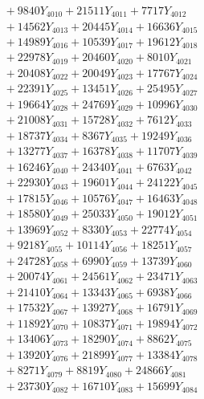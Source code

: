 \documentclass[a4paper,10pt]{article}
\begin{document}
{\begin{align}
&\;  + 9840 Y_{4010} + 21511 Y_{4011} + 7717 Y_{4012} \\[0.3ex]
&\;  + 14562 Y_{4013} + 20445 Y_{4014} + 16636 Y_{4015} \\[0.3ex]
&\;  + 14989 Y_{4016} + 10539 Y_{4017} + 19612 Y_{4018} \\[0.5ex]\allowbreak
&\;  + 22978 Y_{4019} + 20460 Y_{4020} + 8010 Y_{4021} \\[0.3ex]
&\;  + 20408 Y_{4022} + 20049 Y_{4023} + 17767 Y_{4024} \\[0.3ex]
&\;  + 22391 Y_{4025} + 13451 Y_{4026} + 25495 Y_{4027} \\[0.3ex]
&\;  + 19664 Y_{4028} + 24769 Y_{4029} + 10996 Y_{4030} \\[0.3ex]
&\;  + 21008 Y_{4031} + 15728 Y_{4032} + 7612 Y_{4033} \\[0.3ex]
&\;  + 18737 Y_{4034} + 8367 Y_{4035} + 19249 Y_{4036} \\[0.3ex]
&\;  + 13277 Y_{4037} + 16378 Y_{4038} + 11707 Y_{4039} \\[0.3ex]
&\;  + 16246 Y_{4040} + 24340 Y_{4041} + 6763 Y_{4042} \\[0.3ex]
&\;  + 22930 Y_{4043} + 19601 Y_{4044} + 24122 Y_{4045} \\[0.3ex]
&\;  + 17815 Y_{4046} + 10576 Y_{4047} + 16463 Y_{4048} \\[0.5ex]\allowbreak
&\;  + 18580 Y_{4049} + 25033 Y_{4050} + 19012 Y_{4051} \\[0.3ex]
&\;  + 13969 Y_{4052} + 8330 Y_{4053} + 22774 Y_{4054} \\[0.3ex]
&\;  + 9218 Y_{4055} + 10114 Y_{4056} + 18251 Y_{4057} \\[0.3ex]
&\;  + 24728 Y_{4058} + 6990 Y_{4059} + 13739 Y_{4060} \\[0.3ex]
&\;  + 20074 Y_{4061} + 24561 Y_{4062} + 23471 Y_{4063} \\[0.3ex]
&\;  + 21410 Y_{4064} + 13343 Y_{4065} + 6938 Y_{4066} \\[0.3ex]
&\;  + 17532 Y_{4067} + 13927 Y_{4068} + 16791 Y_{4069} \\[0.3ex]
&\;  + 11892 Y_{4070} + 10837 Y_{4071} + 19894 Y_{4072} \\[0.3ex]
&\;  + 13406 Y_{4073} + 18290 Y_{4074} + 8862 Y_{4075} \\[0.3ex]
&\;  + 13920 Y_{4076} + 21899 Y_{4077} + 13384 Y_{4078} \\[0.5ex]\allowbreak
&\;  + 8271 Y_{4079} + 8819 Y_{4080} + 24866 Y_{4081} \\[0.3ex]
&\;  + 23730 Y_{4082} + 16710 Y_{4083} + 15699 Y_{4084} \\[0.3ex]

\end{align}}
\end{document}
